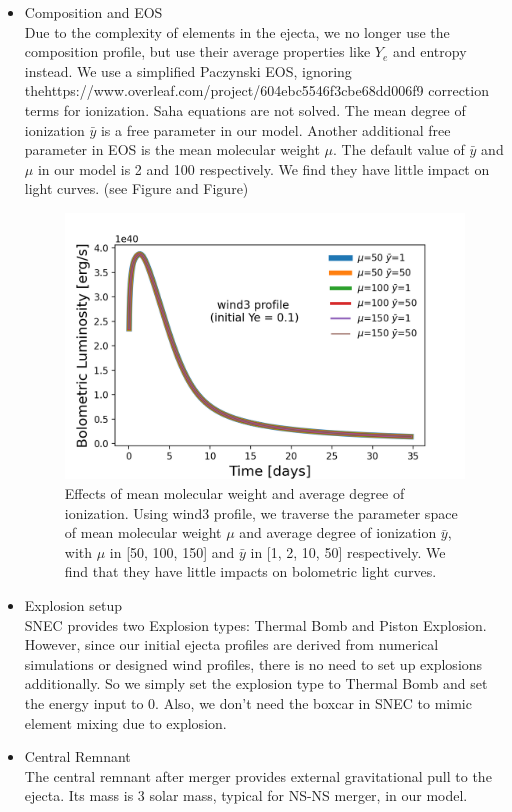 \documentclass[fleqn,usenatbib]{mnras}
\begin{document}
    \begin{itemize}
        \item Composition and EOS \\
        Due to the complexity of elements in the ejecta, we no longer use the composition profile, but use their average properties like $Y_e$ and entropy instead. We use a simplified Paczynski EOS, ignoring thehttps://www.overleaf.com/project/604ebc5546f3cbe68dd006f9 correction terms for ionization. Saha equations are not solved. The mean degree of ionization $\bar y$ is a free parameter in our model. Another additional free parameter in EOS is the mean molecular weight $\mu$. The default value of $\bar y$ and $\mu$ in our model is 2 and 100 respectively. We find they have little impact on light curves. (see Figure and Figure)
        
        \begin{figure}
        \centering
        \includegraphics[scale=0.5]{figures/EOSimpact/Effects_mu_ybar_wind3.png}
        \caption{Effects of mean molecular weight and average degree of ionization. Using wind3 profile, we traverse the parameter space of mean molecular weight $\mu$ and average degree of ionization $\bar{y}$, with $\mu$ in [50, 100, 150] and $\bar{y}$ in [1, 2, 10, 50] respectively. We find that they have little impacts on bolometric light curves. }
        \label{Effects_mu_ybar_wind3}
        \end{figure} 
       
          
      
    	\item Explosion setup \\
    	SNEC provides two Explosion types: Thermal Bomb and Piston Explosion. However, since our initial ejecta profiles are derived from numerical simulations or designed wind profiles, there is no need to set up explosions additionally. So we simply set the explosion type to Thermal Bomb and set the energy input to 0. Also, we don't need the boxcar in SNEC to mimic element mixing due to explosion.
    	
    
    	\item Central Remnant \\
    	The central remnant after merger provides external gravitational pull to the ejecta. Its mass is 3 solar mass, typical for NS-NS merger, in our model.
    	
    \end{itemize}
    
\end{document}
